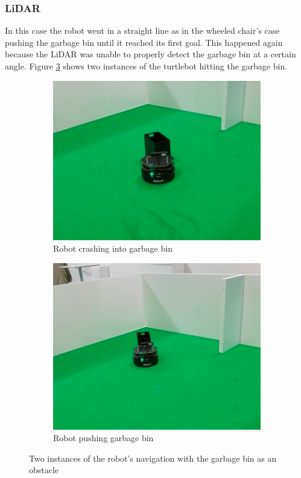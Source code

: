 \subsubsection*{LiDAR}
In this case the robot went in a straight line as in the wheeled chair's case pushing the garbage bin until it reached its first goal. This happened again because the \ac{LiDAR} was unable to properly detect the garbage bin at a certain angle.  Figure \ref{fig:garbageLF} shows two instances of the turtlebot hitting the garbage bin.
\begin{figure}[h!]
  \centering
  \begin{subfigure}[b]{0.49\linewidth}
    \includegraphics[width=\linewidth]{imgs/chapter5/garbageLF.png}
     \caption{Robot crashing into garbage bin}
     \label{fig:garbageLF1}
  \end{subfigure}
  \begin{subfigure}[b]{0.49\linewidth}
    \includegraphics[width=\linewidth]{imgs/chapter5/garbageLF2.png}
    \caption{Robot pushing garbage bin}
    \label{fig:garbageLF2}
  \end{subfigure}
  \caption{Two instances of the robot's navigation with the garbage bin as an obstacle}
  \label{fig:garbageLF}
\end{figure}



